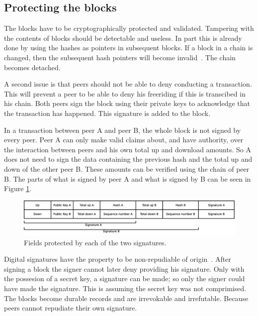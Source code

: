 \subsection{Protecting the blocks}
\label{sect:repudiation}
The blocks have to be cryptographically protected and validated.
Tampering with the contents of blocks should be detectable and useless.
In part this is already done by using the hashes as pointers in subsequent blocks.
If a block in a chain is changed, then the subsequent hash pointers will become invalid~\cite{VanderLubbe-crypto}.
The chain becomes detached.

A second issue is that peers should not be able to deny conducting a transaction.
This will prevent a peer to be able to deny his freeriding if this is transcibed in his chain.
Both peers sign the block using their private keys to acknowledge that the transaction has happened.
This signature is added to the block.

In a transaction between peer A and peer B, the whole block is not signed by every peer.
Peer A can only make valid claims about, and have authority, over the interaction between peers
and his own total up and download amounts.
So A does not need to sign the data containing the previous hash and the total up and down of the other peer B.
These amounts can be verified using the chain of peer B.
The parts of what is signed by peer A and what is signed by B can be seen in Figure \ref{fig:signatures}.
\begin{figure}
	\centerline{\includegraphics[scale=0.3]{design/figs/signatures.eps}}
	\caption{Fields protected by each of the two signatures.}
	\label{fig:signatures}
\end{figure}

Digital signatures have the property to be non-repudiable of origin~\cite{VanderLubbe-crypto}.
After signing a block the signer cannot later deny providing his signature.
Only with the possesion of a secret key,
a signature can be made;
so only the signer could have made the signature.
This is assuming the secret key was not comprimised.
The blocks become durable records and are irrevokable and irrefutable.
Because peers cannot repudiate their own signature.

